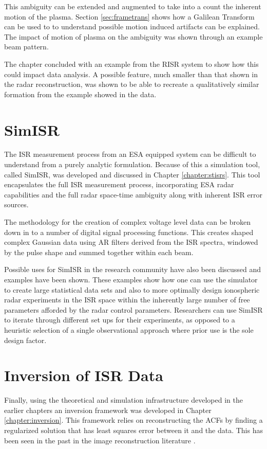 This ambiguity can be extended and augmented to take into a count the inherent motion of the plasma. Section \ref{sec:frametrans} shows how a Galilean Transform can be used to to understand possible motion induced artifacts can be explained. The impact of motion of plasma on the ambiguity was shown through an example beam pattern.

The chapter concluded with an example from the RISR system to show how this could impact data analysis. A possible feature,  much smaller than that shown in the radar reconstruction, was shown to be able to recreate a qualitatively similar formation from the example showed in the data. 
  
\section{SimISR}


The ISR measurement process from an ESA equipped system can be difficult to understand from a purely analytic formulation. Because of this a simulation tool, called SimISR, was developed and discussed in Chapter \ref{chapter:stisrs}. This tool encapsulates the full ISR measurement process, incorporating ESA radar capabilities and the full radar space-time ambiguity along with inherent ISR error sources. 

The methodology for the creation of complex voltage level data can be broken down in to a number of digital signal processing functions. This creates shaped complex Gaussian data using AR filters derived from the ISR spectra, windowed by the pulse shape and summed together within each beam.  

Possible uses for SimISR in the research community have also been discussed and examples have been shown. These examples show how one can use the simulator to create large statistical data sets and also to more optimally design ionospheric radar experiments in the ISR space within the inherently large number of free parameters afforded by the radar control parameters. Researchers can use SimISR to iterate through different set ups for their experiments, as opposed to a heuristic selection of a single observational approach where prior use is the sole design factor. 
 
\section{Inversion of ISR Data}


Finally, using the theoretical and simulation infrastructure developed in the earlier chapters an inversion framework was developed in Chapter \ref{chapter:inversion}. This framework relies on reconstructing the ACFs by finding a regularized solution that has least squares error between it and the data. This has been seen in the past in the image reconstruction literature \citep{Karl:2005jy}.

